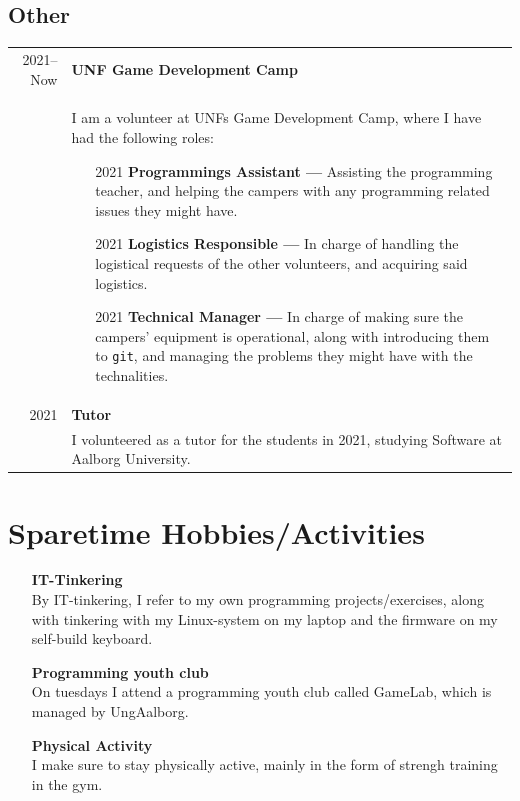\documentclass{article}
\begin{document}
    \subsection*{Other}
    \begin{tabular}{r|p{.82\linewidth}}
        2021--Now & \textbf{UNF Game Development Camp}\\
    &   I am a volunteer at UNFs Game Development Camp, where I have had the following roles:
        \begin{itemize}\setlength\itemsep{0em}
            \item[2021] \textbf{Programmings Assistant ---} Assisting the programming teacher, and
                helping the campers with any programming related issues they might have.
            \item[2021] \textbf{Logistics Responsible ---} In charge of handling the logistical
                requests of the other volunteers, and acquiring said logistics.
            \item[2021] \textbf{Technical Manager ---} In charge of making sure the campers'
                equipment is operational, along with introducing them to \verb|git|, and managing
                the problems they might have with the technalities.
        \end{itemize}
        \\
        2021 & \textbf{Tutor}\\
    &   I volunteered as a tutor for the students in 2021, studying Software at Aalborg University. 
    \end{tabular}

    \section*{Sparetime Hobbies/Activities}
    \begin{itemize}\setlength\itemsep{0.5em}
        \item[] \textbf{IT-Tinkering}\\
            By IT-tinkering, I refer to my own programming projects/exercises, along with tinkering
            with my Linux-system on my laptop and the firmware on my self-build keyboard.
        \item[] \textbf{Programming youth club}\\
            On tuesdays I attend a programming youth club called GameLab, which is managed by
            UngAalborg.
        \item[] \textbf{Physical Activity}\\
            I make sure to stay physically active, mainly in the form of strengh training in the
            gym.
    \end{itemize}
\end{document}
